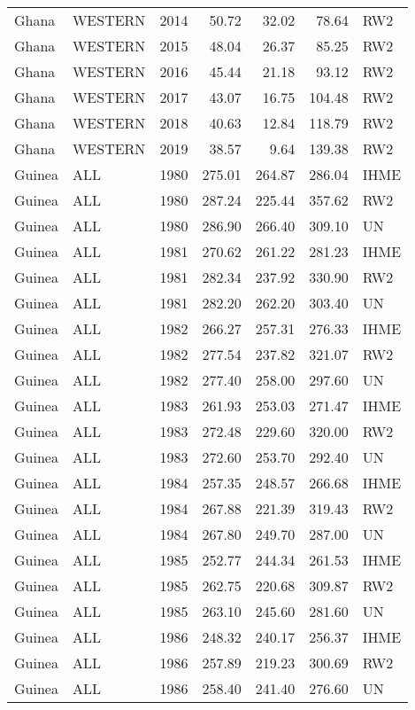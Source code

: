 \begin{longtable}{lllrrrl}
  Ghana & WESTERN & 2014 & 50.72 & 32.02 & 78.64 & RW2 \\ 
  Ghana & WESTERN & 2015 & 48.04 & 26.37 & 85.25 & RW2 \\ 
  Ghana & WESTERN & 2016 & 45.44 & 21.18 & 93.12 & RW2 \\ 
  Ghana & WESTERN & 2017 & 43.07 & 16.75 & 104.48 & RW2 \\ 
  Ghana & WESTERN & 2018 & 40.63 & 12.84 & 118.79 & RW2 \\ 
  Ghana & WESTERN & 2019 & 38.57 & 9.64 & 139.38 & RW2 \\ 
  Guinea & ALL & 1980 & 275.01 & 264.87 & 286.04 & IHME \\ 
  Guinea & ALL & 1980 & 287.24 & 225.44 & 357.62 & RW2 \\ 
  Guinea & ALL & 1980 & 286.90 & 266.40 & 309.10 & UN \\ 
  Guinea & ALL & 1981 & 270.62 & 261.22 & 281.23 & IHME \\ 
  Guinea & ALL & 1981 & 282.34 & 237.92 & 330.90 & RW2 \\ 
  Guinea & ALL & 1981 & 282.20 & 262.20 & 303.40 & UN \\ 
  Guinea & ALL & 1982 & 266.27 & 257.31 & 276.33 & IHME \\ 
  Guinea & ALL & 1982 & 277.54 & 237.82 & 321.07 & RW2 \\ 
  Guinea & ALL & 1982 & 277.40 & 258.00 & 297.60 & UN \\ 
  Guinea & ALL & 1983 & 261.93 & 253.03 & 271.47 & IHME \\ 
  Guinea & ALL & 1983 & 272.48 & 229.60 & 320.00 & RW2 \\ 
  Guinea & ALL & 1983 & 272.60 & 253.70 & 292.40 & UN \\ 
  Guinea & ALL & 1984 & 257.35 & 248.57 & 266.68 & IHME \\ 
  Guinea & ALL & 1984 & 267.88 & 221.39 & 319.43 & RW2 \\ 
  Guinea & ALL & 1984 & 267.80 & 249.70 & 287.00 & UN \\ 
  Guinea & ALL & 1985 & 252.77 & 244.34 & 261.53 & IHME \\ 
  Guinea & ALL & 1985 & 262.75 & 220.68 & 309.87 & RW2 \\ 
  Guinea & ALL & 1985 & 263.10 & 245.60 & 281.60 & UN \\ 
  Guinea & ALL & 1986 & 248.32 & 240.17 & 256.37 & IHME \\ 
  Guinea & ALL & 1986 & 257.89 & 219.23 & 300.69 & RW2 \\ 
  Guinea & ALL & 1986 & 258.40 & 241.40 & 276.60 & UN \\ 

\end{longtable}
